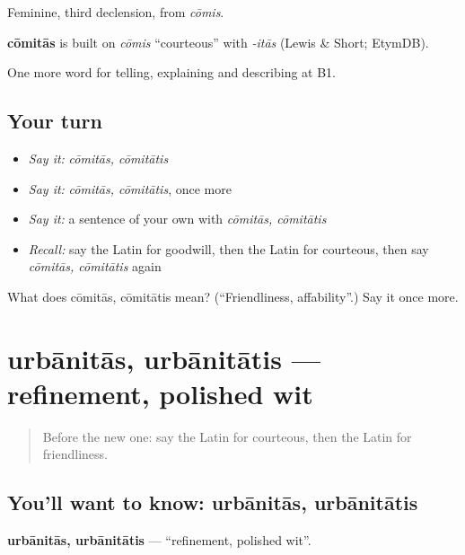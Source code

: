 Feminine, third declension, from \emph{cōmis}.

\begin{cousinweb}
\textbf{cōmitās} is built on \emph{cōmis} \textquotedblleft{}courteous\textquotedblright{} with \emph{-itās} (Lewis \& Short; EtymDB).
\end{cousinweb}

\begin{grammarlens}[title={What you've built}]
One more word for telling, explaining and describing at B1.
\end{grammarlens}

\subsection*{Your turn}
\begin{itemize}
\raggedright
  \item \emph{Say it:} \emph{cōmitās, cōmitātis}
  \item \emph{Say it:} \emph{cōmitās, cōmitātis}, once more
  \item \emph{Say it:} a sentence of your own with \emph{cōmitās, cōmitātis}
  \item \emph{Recall:} say the Latin for goodwill, then the Latin for courteous, then say \emph{cōmitās, cōmitātis} again
\end{itemize}

\begin{tcolorbox}[breakable,colback=teal!4,colframe=teal!35!black,title={Before you move on}]
What does cōmitās, cōmitātis mean? (\textquotedblleft{}Friendliness, affability\textquotedblright{}.) Say it once more.
\end{tcolorbox}
\section[urbānitās, urbānitātis]{urbānitās, urbānitātis — refinement, polished wit}

\label{lesson:LA-C506-urbanitas}



\begin{quote}
Before the new one: say the Latin for courteous, then the Latin for friendliness.
\end{quote}

\subsection*{You'll want to know: urbānitās, urbānitātis}
\textbf{urbānitās, urbānitātis} — \textquotedblleft{}refinement, polished wit\textquotedblright{}.

